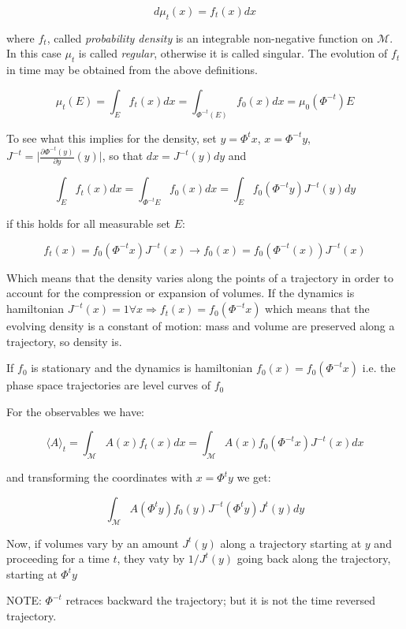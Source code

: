 \documentclass{article}
\begin{document}
\begin{equation}
d \mu_t(x) = f_t(x) dx
\end{equation} 

where $f_t$, called \emph{probability density} is an integrable non-negative function on $\mathcal{M}$. In this case $\mu_t$ is called \emph{regular}, otherwise it is called singular.
The evolution of $f_t$ in time may be obtained from the above definitions.

$$\mu_t(E) = \int_{E} f_t(x) dx = \int_{\Phi^{-t}(E)} f_0(x) dx = \mu_0(\Phi^{-t})E$$

To see what this implies for the density, set $y = \Phi^t x$, $x = \Phi^{-t} y$, $J^{-t} = \big | \frac{ \partial \Phi^{-t}(y)}{\partial y} (y) \big |$, so that $dx = J^{-t}(y)dy$ and

$$ \int_{E} f_t(x) dx = \int_{\Phi^{-t}E} f_0(x)dx = \int_{E} f_0(\Phi^{-t}y) J^{-t}(y) dy $$

if this holds for all measurable set $E$:

\begin{equation}
f_t(x) = f_0(\Phi^{-t} x) J^{-t}(x) \longrightarrow f_0(x) = f_0(\Phi^{-t}(x)) J^{-t}(x)
\end{equation}

Which means that the density varies along the points of a trajectory in order to account for the compression or expansion of volumes. If the dynamics is hamiltonian
$J^{-t}(x)=1 \forall x \Rightarrow f_t(x) = f_0(\Phi^{-t}x)$ which means that the evolving density is a constant of motion: mass and volume are preserved along a trajectory, so density is.

If $f_0$ is stationary and the dynamics is hamiltonian $f_0(x) = f_0(\Phi^{-t}x)$ i.e. the phase space trajectories are level curves of $f_0$

For the observables we have:

$$\langle A \rangle_t = \int_{\mathcal{M}} A(x) f_t(x) dx = \int_{\mathcal{M}} A(x) f_0(\Phi^{-t} x) J^{-t}(x) dx$$

and transforming the coordinates with $x = \Phi^t y$ we get:

$$ \int_{ \mathcal{M} } A(\Phi^t y) f_0(y) J^{-t}(\Phi^t y) J^t(y) dy$$

Now, if volumes vary by an amount $J^t(y)$ along a trajectory starting at $y$ and proceeding for a time $t$, they vaty by $1/ J^t(y)$ going back along the trajectory, starting at $\Phi^t y$

NOTE: $\Phi^{-t}$ retraces backward the trajectory; but it is not the time reversed trajectory.
\end{document}
